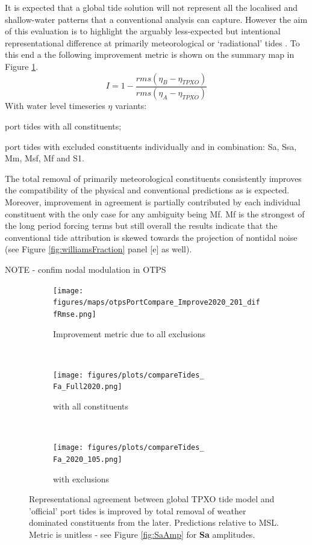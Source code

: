 It is expected that a global tide solution will not represent all the localised and shallow-water patterns that a conventional analysis can capture.   However the aim of this evaluation is to highlight the arguably less-expected but intentional representational difference at primarily meteorological or `radiational' tides \cite{10.1016/b978-0-444-53802-4.00058-0}.   To this end a the following improvement metric is shown on the summary map in Figure \ref{fig:improveOtps}.
\begin{equation}
    I = 1- \frac{rms(\eta_{B}-\eta_{TPXO})}{rms(\eta_{A}-\eta_{TPXO})}
    \label{eq:improvment}
\end{equation}
With water level timeseries $\eta$ variants:
\begin{inparaenum}
[A)]
    \item port tides with all constituents; 
    \item port tides with excluded constituents individually and in combination: Sa, Ssa, Mm, Msf, Mf and S1.
\end{inparaenum}

The total removal of primarily meteorological constituents consistently improves the compatibility of the physical and conventional predictions as is expected.   Moreover, improvement in agreement is partially contributed by each individual constituent with the only case for any ambiguity being Mf. Mf is the strongest of the long period forcing terms but still overall the results indicate that the conventional tide attribution is skewed towards the projection of nontidal noise (see Figure \ref{fig:williamsFraction} panel [e] as well). 


NOTE - confim nodal modulation in OTPS


\begin{figure}[H]\centering    
    \begin{subfigure}[b]{\figwidthFull}
        \texttt{[image: figures/maps/otpsPortCompare\_Improve2020\_201\_diffRmse.png]}
        \caption{Improvement metric due to all exclusions}
    \end{subfigure}
    \\
    \begin{subfigure}[b]{\figwidthFull}
        \texttt{[image: figures/plots/compareTides\_\\Fa\_Full2020.png]} 
        \caption{\Fname{} with all constituents}
    \end{subfigure}
    \\
    \begin{subfigure}[b]{\figwidthFull}
        \texttt{[image: figures/plots/compareTides\_\\Fa\_2020\_105.png]} 
        \caption{\Fname{} with exclusions}
    \end{subfigure}
    \caption{Representational agreement between global TPXO tide model and 'official' port tides is improved by total removal of weather dominated constituents from the later.   Predictions relative to MSL.  Metric is unitless - see Figure \ref{fig:SaAmp} for \textbf{Sa} amplitudes.}
    \label{fig:improveOtps}
\end{figure}   


